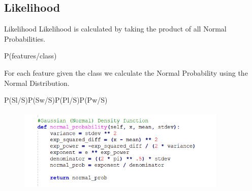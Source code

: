 \documentclass{beamer}
\begin{document}
\subsection{Likelihood}
    \begin{frame}{Likelihood}
        \hspace{0.5cm} Likelihood is calculated by taking the product of all Normal Probabilities. 
        \begin{center}
            \textcolor[rgb]{1.0,0.0,0.0} {P(features/class)}\\
        \end{center}
        \hspace{0.5cm} For each feature given the class we calculate the Normal Probability using the Normal Distribution. 
        \begin{center}
            \textcolor[rgb]{1.0,0.0,0.0}{P(Sl/S)P(Sw/S)P(Pl/S)P(Pw/S)}\\
        \end{center}
        \begin{center}
            \begin{figure}
                \begin{center}
                    \includegraphics[width = 10cm, height = 4cm]{Theme/images/normal_probs.PNG}
                \end{center}
            \end{figure}
        \end{center}
    \end{frame}
\end{document}

